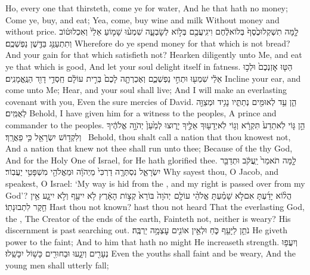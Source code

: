 {Ho, every one that thirsteth, come ye for water, And he that hath no money; Come ye, buy, and eat; Yea, come, buy wine and milk Without money and without price.}
{לָ֤מָּה תִשְׁקְלוּ\maqqaf כֶ֙סֶף֙ בְּלוֹא\maqqaf לֶ֔חֶם וִיגִֽיעֲכֶ֖ם בְּל֣וֹא לְשׇׂבְעָ֑ה שִׁמְע֨וּ שָׁמ֤וֹעַ אֵלַי֙ וְאִכְלוּ\maqqaf ט֔וֹב וְתִתְעַנַּ֥ג בַּדֶּ֖שֶׁן נַפְשְׁכֶֽם׃}
{Wherefore do ye spend money for that which is not bread? And your gain for that which satisfieth not? Hearken diligently unto Me, and eat ye that which is good, And let your soul delight itself in fatness.}
{הַטּ֤וּ אׇזְנְכֶם֙ וּלְכ֣וּ אֵלַ֔י שִׁמְע֖וּ וּתְחִ֣י נַפְשְׁכֶ֑ם וְאֶכְרְתָ֤ה לָכֶם֙ בְּרִ֣ית עוֹלָ֔ם חַֽסְדֵ֥י דָוִ֖ד הַנֶּֽאֱמָנִֽים׃}
{Incline your ear, and come unto Me; Hear, and your soul shall live; And I will make an everlasting covenant with you, Even the sure mercies of David.}
{הֵ֛ן עֵ֥ד לְאוּמִּ֖ים נְתַתִּ֑יו נָגִ֥יד וּמְצַוֵּ֖ה לְאֻמִּֽים׃}
{Behold, I have given him for a witness to the peoples, A prince and commander to the peoples.}
{הֵ֣ן גּ֤וֹי לֹֽא\maqqaf תֵדַע֙ תִּקְרָ֔א וְג֥וֹי לֹֽא\maqqaf יְדָע֖וּךָ אֵלֶ֣יךָ יָר֑וּצוּ לְמַ֙עַן֙ יְהֹוָ֣ה אֱלֹהֶ֔יךָ וְלִקְד֥וֹשׁ יִשְׂרָאֵ֖ל כִּ֥י פֵאֲרָֽךְ׃ \setuma }
{Behold, thou shalt call a nation that thou knowest not, And a nation that knew not thee shall run unto thee; Because of the \lord\space thy God, And for the Holy One of Israel, for He hath glorified thee.}
\newperek
{}
\label{haft_3}
\setcounter{chap}{40}
\setcounter{verse}{27}
{לָ֤מָּה תֹאמַר֙ יַֽעֲקֹ֔ב וּתְדַבֵּ֖ר יִשְׂרָאֵ֑ל נִסְתְּרָ֤ה דַרְכִּי֙ מֵיְהֹוָ֔ה וּמֵאֱלֹהַ֖י מִשְׁפָּטִ֥י יַעֲבֽוֹר׃}
{Why sayest thou, O Jacob, and speakest, O Israel: ‘My way is hid from the \lord, and my right is passed over from my God’?}
{הֲל֨וֹא יָדַ֜עְתָּ אִם\maqqaf לֹ֣א שָׁמַ֗עְתָּ אֱלֹהֵ֨י עוֹלָ֤ם \pasek  יְהֹוָה֙ בּוֹרֵא֙ קְצ֣וֹת הָאָ֔רֶץ לֹ֥א יִיעַ֖ף וְלֹ֣א יִיגָ֑ע אֵ֥ין חֵ֖קֶר לִתְבוּנָתֽוֹ׃}
{Hast thou not known? hast thou not heard That the everlasting God, the \lord, The Creator of the ends of the earth, Fainteth not, neither is weary? His discernment is past searching out.}
{נֹתֵ֥ן לַיָּעֵ֖ף כֹּ֑חַ וּלְאֵ֥ין אוֹנִ֖ים עׇצְמָ֥ה יַרְבֶּֽה׃}
{He giveth power to the faint; And to him that hath no might He increaseth strength.}
{וְיִעֲפ֥וּ נְעָרִ֖ים וְיִגָ֑עוּ וּבַחוּרִ֖ים כָּשׁ֥וֹל יִכָּשֵֽׁלוּ׃}
{Even the youths shall faint and be weary, And the young men shall utterly fall;}
